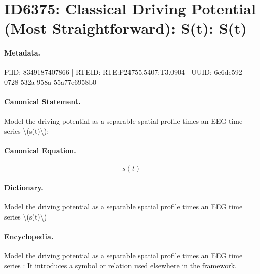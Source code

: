 \section*{ID6375: Classical Driving Potential (Most Straightforward): S(t): S(t)}
\paragraph{Metadata.}
PiID: 8349187407866 | RTEID: RTE:P24755.5407:T3.0904 | UUID: 6e6de592-0728-532a-958a-55a77e6958b0

\paragraph{Canonical Statement.}
Model the driving potential as a separable spatial profile times an EEG time series \textbackslash{}(s(t)\textbackslash{}):

\paragraph{Canonical Equation.}
\[
s(t)
\]

\paragraph{Dictionary.}
Model the driving potential as a separable spatial profile times an EEG time series \textbackslash{}(s(t)\textbackslash{})

\paragraph{Encyclopedia.}
Model the driving potential as a separable spatial profile times an EEG time series : It introduces a symbol or relation used elsewhere in the framework.
